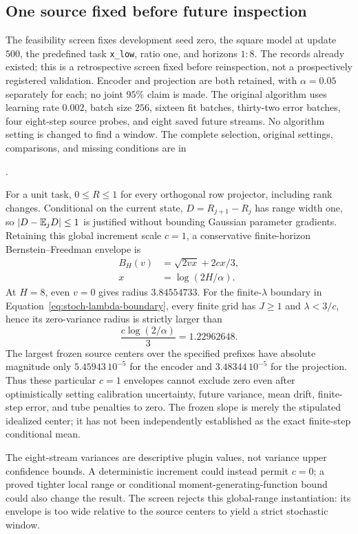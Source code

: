 \subsection{One source fixed before future inspection}
The feasibility screen fixes development seed zero, the square model at update $500$, the predefined task \texttt{x\_low}, ratio one, and horizons $1{:}8$. The records already existed; this is a retrospective screen fixed before reinspection, not a prospectively registered validation. Encoder and projection are both retained, with $\alpha=0.05$ separately for each; no joint $95\%$ claim is made. The original algorithm uses learning rate $0.002$, batch size $256$, sixteen fit batches, thirty-two error batches, four eight-step source probes, and eight saved future streams. No algorithm setting is changed to find a window. The complete selection, original settings, comparisons, and missing conditions are in
\begin{center}
.
\end{center}

For a unit task, $0\le R\le1$ for every orthogonal row projector, including rank changes. Conditional on the current state, $D=R_{j+1}-R_j$ has range width one, so $|D-\mathbb E_jD|\le1$ is justified without bounding Gaussian parameter gradients. Retaining this global increment scale $c=1$, a conservative finite-horizon Bernstein--Freedman envelope is
\begin{align}
 B_H(v)&=\sqrt{2vx}+2cx/3,\\
 x&=\log(2H/\alpha).
\end{align}
At $H=8$, even $v=0$ gives radius $3.84554733$. For the finite-$\lambda$ boundary in Equation~\eqref{eq:stoch-lambda-boundary}, every finite grid has $J\ge1$ and $\lambda<3/c$, hence its zero-variance radius is strictly larger than
\begin{equation}
 \frac{c\log(2/\alpha)}3=1.22962648.
\end{equation}
The largest frozen source centers over the specified prefixes have absolute magnitude only $5.45943\,10^{-5}$ for the encoder and $3.48344\,10^{-5}$ for the projection. Thus these particular $c=1$ envelopes cannot exclude zero even after optimistically setting calibration uncertainty, future variance, mean drift, finite-step error, and tube penalties to zero. The frozen slope is merely the stipulated idealized center; it has not been independently established as the exact finite-step conditional mean.

The eight-stream variances are descriptive plugin values, not variance upper confidence bounds. A deterministic increment could instead permit $c=0$; a proved tighter local range or conditional moment-generating-function bound could also change the result. The screen rejects this global-range instantiation: its envelope is too wide relative to the source centers to yield a strict stochastic window.

